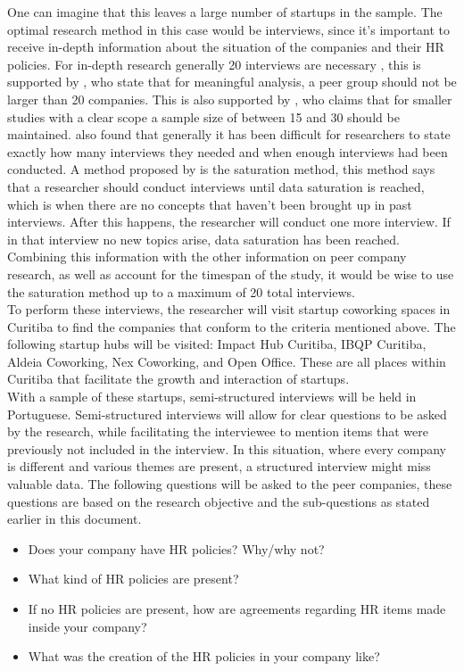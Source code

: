 \documentclass[man]{apa6}
\begin{document}
One can imagine that this leaves a large number of startups in the sample. The optimal research method in this case would be interviews, since it's important to receive in-depth information about the situation of the companies and their HR policies. For in-depth research generally 20 interviews are necessary \parencite{BAKEREDWARDS2012}, this is supported by \cite{SNL2013}, who state that for meaningful analysis, a peer group should not be larger than 20 companies. This is also supported by \parencite{MASON2010}, who claims that for smaller studies with a clear scope a sample size of between 15 and 30 should be maintained. \cite{MASON2010} also found that generally it has been difficult for researchers to state exactly how many interviews they needed and when enough interviews had been conducted. A method proposed by \cite{FUSCH2015} is the saturation method, this method says that a researcher should conduct interviews until data saturation is reached, which is when there are no concepts that haven't been brought up in past interviews. After this happens, the researcher will conduct one more interview. If in that interview no new topics arise, data saturation has been reached. Combining this information with the other information on peer company research, as well as account for the timespan of the study, it would be wise to use the saturation method up to a maximum of 20 total interviews.\\
To perform these interviews, the researcher will visit startup coworking spaces in Curitiba to find the companies that conform to the criteria mentioned above. The following startup hubs will be visited: Impact Hub Curitiba, IBQP Curitiba, Aldeia Coworking, Nex Coworking, and Open Office. These are all places within Curitiba that facilitate the growth and interaction of startups. \\

With a sample of these startups, semi-structured interviews will be held in Portuguese. Semi-structured interviews will allow for clear questions to be asked by the research, while facilitating the interviewee to mention items that were previously not included in the interview. In this situation, where every company is different and various themes are present, a structured interview might miss valuable data. The following questions will be asked to the peer companies, these questions are based on the research objective and the sub-questions as stated earlier in this document.
\begin{itemize}
\item Does your company have HR policies? Why/why not?
\item What kind of HR policies are present?
\item If no HR policies are present, how are agreements regarding HR items made inside your company?
\item What was the creation of the HR policies in your company like?
\end{itemize}
\end{document}

